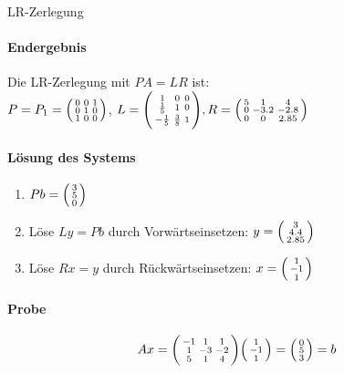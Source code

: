 \begin{example2}[breakable]{LR-Zerlegung}
\paragraph{Endergebnis}
Die LR-Zerlegung mit $PA = LR$ ist:
\vspace{2mm}\\
$P = P_1 = \begin{psmallmatrix}
0 & 0 & 1\\
0 & 1 & 0\\
1 & 0 & 0
\end{psmallmatrix}$, 
$L = \begin{psmallmatrix}
1 & 0 & 0\\
\frac{1}{5} & 1 & 0\\
-\frac{1}{5} & \frac{3}{8} & 1
\end{psmallmatrix}, 
R = \begin{psmallmatrix}
5 & 1 & 4\\
0 & -3.2 & -2.8\\
0 & 0 & 2.85
\end{psmallmatrix}$

\paragraph{Lösung des Systems}
\begin{enumerate}
    \item $Pb = \begin{psmallmatrix} 3\\ 5\\ 0 \end{psmallmatrix}$
    \item Löse $Ly = Pb$ durch Vorwärtseinsetzen:
    $y = \begin{psmallmatrix} 3\\ 4.4\\ 2.85 \end{psmallmatrix}$
    \item Löse $Rx = y$ durch Rückwärtseinsetzen:
    $x = \begin{psmallmatrix} 1\\ -1\\ 1 \end{psmallmatrix}$
\end{enumerate}

\paragraph{Probe}
$$Ax = \begin{psmallmatrix}
-1 & 1 & 1\\
1 & -3 & -2\\
5 & 1 & 4
\end{psmallmatrix} \begin{psmallmatrix} 1\\ -1\\ 1 \end{psmallmatrix} = \begin{psmallmatrix} 0\\ 5\\ 3 \end{psmallmatrix} = b$$
\end{example2}

